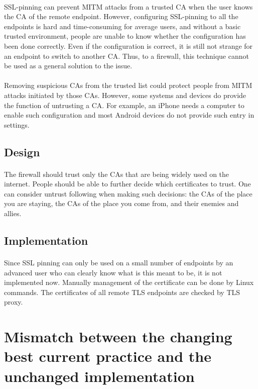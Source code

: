 \documentclass[mscthesis]{usiinfthesis}
\begin{document}
\paragraph{}
SSL-pinning can prevent MITM attacks from a trusted CA when the user knows the CA of the remote endpoint. However, configuring SSL-pinning to all the endpoints is hard and time-consuming for average users, and without a basic trusted environment, people are unable to know whether the configuration has been done correctly. Even if the configuration is correct, it is still not strange for an endpoint to switch to another CA. Thus, to a firewall, this technique cannot be used as a general solution to the issue.
\paragraph{}
Removing suspicious CAs from the trusted list could protect people from MITM attacks initiated by those CAs. However, some systems and devices do provide the function of untrusting a CA. For example, an iPhone needs a computer to enable such configuration and most Android devices do not provide such entry in settings.
\subsection{Design}
\paragraph{}
The firewall should trust only the CAs that are being widely used on the internet. People should be able to further decide which certificates to trust. One can consider untrust following when making such decisions: the CAs of the place you are staying, the CAs of the place you come from, and their enemies and allies.
\subsection{Implementation}
\paragraph{}
Since SSL pinning can only be used on a small number of endpoints by an advanced user who can clearly know what is this meant to be, it is not implemented now. Manually management of the certificate can be done by Linux commands. The certificates of all remote TLS endpoints are checked by TLS proxy.

\section{Mismatch between the changing best current practice and the unchanged implementation}
\end{document}
